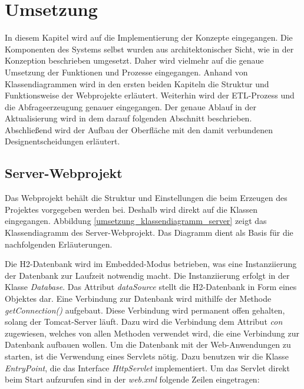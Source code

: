 

\chapter{Umsetzung}
\label{ch:umsetzung}

In diesem Kapitel wird auf die Implementierung der Konzepte eingegangen. Die Komponenten des Systems selbst wurden aus architektonischer Sicht, wie in der Konzeption beschrieben umgesetzt. Daher wird vielmehr auf die genaue Umsetzung der Funktionen und Prozesse eingegangen. Anhand von Klassendiagrammen wird in den ersten beiden Kapiteln die Struktur und Funktionsweise der Webprojekte erläutert. Weiterhin wird der ETL-Prozess und die Abfrageerzeugung genauer eingegangen. Der genaue Ablauf in der Aktualisierung wird in dem darauf folgenden Abschnitt beschrieben. Abschließend wird der Aufbau der Oberfläche mit den damit verbundenen Designentscheidungen erläutert. 

\section{Server-Webprojekt}

Das Webprojekt behält die Struktur und Einstellungen die beim Erzeugen des Projektes vorgegeben werden bei. Deshalb wird direkt auf die Klassen eingegangen. Abbildung \ref{umsetzung_klassendiagramm_server} zeigt das Klassendiagramm des Server-Webprojekt. Das Diagramm dient als Basis für die nachfolgenden Erläuterungen. 

Die H2-Datenbank wird im Embedded-Modus betrieben, was eine Instanziierung der Datenbank zur Laufzeit notwendig macht. Die Instanziierung erfolgt in der Klasse \textit{Database}. Das Attribut \textit{dataSource} stellt die H2-Datenbank in Form eines Objektes dar. Eine Verbindung zur Datenbank wird mithilfe der Methode \textit{getConnection()} aufgebaut. Diese Verbindung wird permanent offen gehalten, solang der Tomcat-Server läuft. Dazu wird die Verbindung dem Attribut \textit{con} zugewiesen, welches von allen Methoden verwendet wird, die eine Verbindung zur Datenbank aufbauen wollen. Um die Datenbank mit der Web-Anwendungen zu starten, ist die Verwendung eines Servlets nötig. Dazu benutzen wir die Klasse \textit{EntryPoint}, die das Interface \textit{HttpServlet} implementiert. Um das Servlet direkt beim Start aufzurufen sind in der \textit{web.xml} folgende Zeilen eingetragen: 

